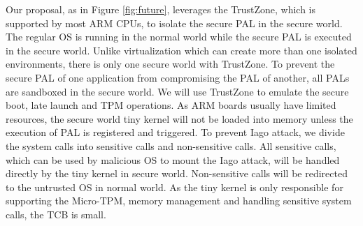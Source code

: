 Our proposal, as in Figure \ref{fig:future}, leverages the TrustZone, which is
supported by most ARM CPUs, to isolate the secure PAL in the secure world. The
regular OS is running in the normal world while the secure PAL is executed in
the secure world. Unlike virtualization which can create more than one isolated
environments, there is only one secure world with TrustZone. To prevent the
secure PAL of one application from compromising the PAL of another, all PALs
are sandboxed in the secure world. We will use TrustZone to emulate the secure
boot, late launch and TPM operations. As ARM boards usually have limited
resources, the secure world tiny kernel will not be loaded into memory unless
the execution of PAL is registered and triggered. To prevent Iago attack, we
divide the system calls into sensitive calls and non-sensitive calls. All
sensitive calls, which can be used by malicious OS to mount the Iago attack,
will be handled directly by the tiny kernel in secure world. Non-sensitive
calls will be redirected to the untrusted OS in normal world. As the tiny
kernel is only responsible for supporting the Micro-TPM, memory management and
handling sensitive system calls, the TCB is small.

